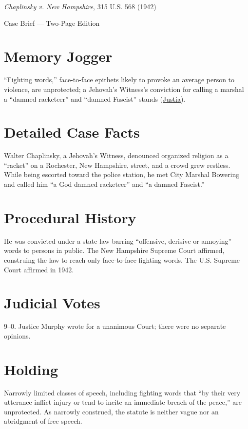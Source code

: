 \documentclass[12pt]{article}
\begin{document}
\begin{center}
{\LARGE \textit{Chaplinsky v. New Hampshire}, 315 U.S. 568 (1942)\par}
\vspace{0.5em}
{\large Case Brief --- Two-Page Edition\par}
\end{center}

\section{Memory Jogger}
``Fighting words,'' face-to-face epithets likely to provoke an average person to violence, are unprotected; a Jehovah's Witness's conviction for calling a marshal a ``damned racketeer'' and ``damned Fascist'' stands (\href{https://supreme.justia.com/cases/federal/us/315/568/}{Justia}).

\section{Detailed Case Facts}
Walter Chaplinsky, a Jehovah's Witness, denounced organized religion as a ``racket'' on a Rochester, New Hampshire, street, and a crowd grew restless. While being escorted toward the police station, he met City Marshal Bowering and called him ``a God damned racketeer'' and ``a damned Fascist.''

\section{Procedural History}
He was convicted under a state law barring ``offensive, derisive or annoying'' words to persons in public. The New Hampshire Supreme Court affirmed, construing the law to reach only face-to-face fighting words. The U.S. Supreme Court affirmed in 1942.

\section{Judicial Votes}
9--0. Justice Murphy wrote for a unanimous Court; there were no separate opinions.

\section{Holding}
Narrowly limited classes of speech, including fighting words that ``by their very utterance inflict injury or tend to incite an immediate breach of the peace,'' are unprotected. As narrowly construed, the statute is neither vague nor an abridgment of free speech.
\end{document}
